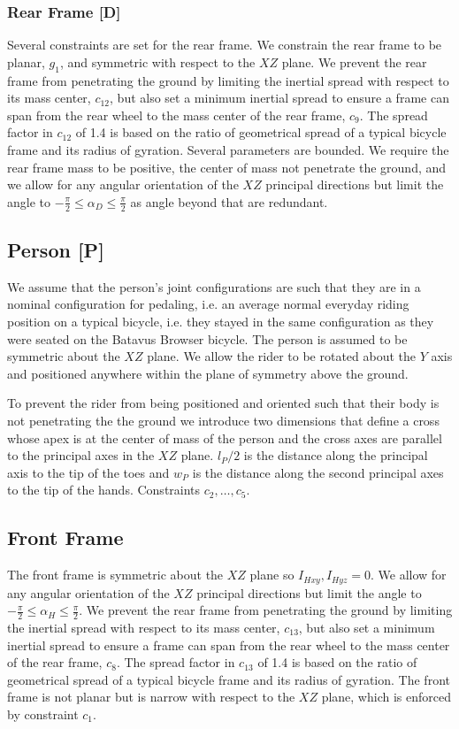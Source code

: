 \documentclass{bmd2019a}
\begin{document}
\subsubsection*{Rear Frame [D]}
%
Several constraints are set for the rear frame. We constrain the rear frame to
be planar, $g_1$, and symmetric with respect to the $XZ$ plane. We prevent the
rear frame from penetrating the ground by limiting the inertial spread with
respect to its mass center, $c_{12}$, but also set a minimum inertial spread to
ensure a frame can span from the rear wheel to the mass center of the rear
frame, $c_9$. The spread factor in $c_{12}$ of 1.4 is based on the ratio of
geometrical spread of a typical bicycle frame and its radius of gyration.
Several parameters are bounded. We require the rear frame mass to be positive,
the center of mass not penetrate the ground, and we allow for any angular
orientation of the $XZ$ principal directions but limit the angle to
$-\frac{\pi}{2} \leq \alpha_D \leq \frac{\pi}{2}$ as angle beyond that are
redundant.

\subsection{Person [P]}

We assume that the person's joint configurations are such that they are in a
nominal configuration for pedaling, i.e. an average normal everyday riding
position on a typical bicycle, i.e. they stayed in the same configuration as
they were seated on the Batavus Browser bicycle. The person is assumed to be
symmetric about the $XZ$ plane. We allow the rider to be rotated about the $Y$
axis and positioned anywhere within the plane of symmetry above the ground.

To prevent the rider from being positioned and oriented such that their body is
not penetrating the the ground we introduce two dimensions that define a cross
whose apex is at the center of mass of the person and the cross axes are
parallel to the principal axes in the $XZ$ plane. $l_P / 2$ is the distance
along the principal axis to the tip of the toes and $w_P$ is the distance along
the second principal axes to the tip of the hands. Constraints
$c_2,\ldots,c_5$.

\subsection{Front Frame}
%
The front frame is symmetric about the $XZ$ plane so $I_{Hxy}, I_{Hyz} = 0$. We
allow for any angular orientation of the $XZ$ principal directions but limit
the angle to $-\frac{\pi}{2} \leq \alpha_H \leq \frac{\pi}{2}$.  We prevent the
rear frame from penetrating the ground by limiting the inertial spread with
respect to its mass center, $c_{13}$, but also set a minimum inertial spread to
ensure a frame can span from the rear wheel to the mass center of the rear
frame, $c_8$. The spread factor in $c_{13}$ of 1.4 is based on the ratio of
geometrical spread of a typical bicycle frame and its radius of gyration. The
front frame is not planar but is narrow with respect to the $XZ$ plane, which
is enforced by constraint $c_1$.
\end{document}
